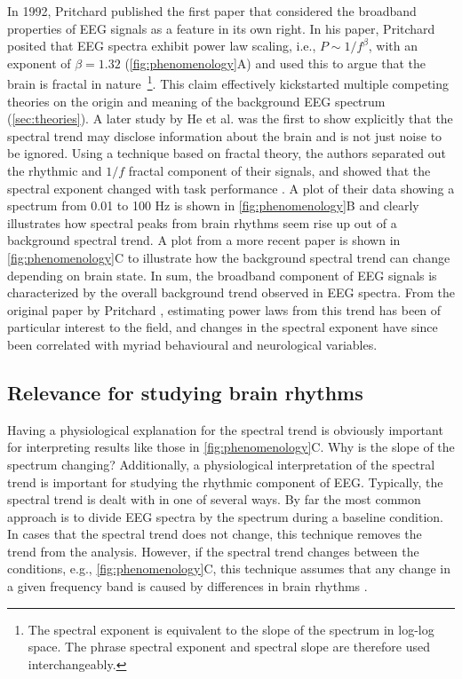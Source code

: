 In 1992, Pritchard \cite{Pritchard1992} published the first paper that considered the broadband properties of EEG signals as a feature in its own right. In his paper, Pritchard posited that EEG spectra exhibit power law scaling, i.e., $P\sim1/f^\beta$, with an exponent of $\beta=1.32$ (\autoref{fig:phenomenology}A) and used this to argue that the brain is fractal in nature~\footnote[2]{The spectral exponent is equivalent to the slope of the spectrum in log-log space. The phrase spectral exponent and spectral slope are therefore used interchangeably.}. This claim effectively kickstarted multiple competing theories on the origin and meaning of the background EEG spectrum (\autoref{sec:theories}). A later study by He et al. \cite{He2010} was the first to show explicitly that the spectral trend may disclose information about the brain and is not just noise to be ignored. Using a technique based on fractal theory, the authors separated out the rhythmic and $1/f$ fractal component of their signals, and showed that the spectral exponent changed with task performance \cite{He2010}. A plot of their data showing a spectrum from 0.01 to 100 \unit{\hertz} is shown in \autoref{fig:phenomenology}B and clearly illustrates how spectral peaks from brain rhythms seem rise up out of a background spectral trend. A plot from a more recent paper \cite{Colombo2019} is shown in \autoref{fig:phenomenology}C to illustrate how the background spectral trend can change depending on brain state. In sum, the broadband component of EEG signals is characterized by the overall background trend observed in EEG spectra. From the original paper by Pritchard \cite{Pritchard1992}, estimating power laws from this trend has been of particular interest to the field, and changes in the spectral exponent have since been correlated with myriad behavioural and neurological variables.

\subsection{Relevance for studying brain rhythms} \label{sec:detrending}
Having a physiological explanation for the spectral trend is obviously important for interpreting results like those in \autoref{fig:phenomenology}C. Why is the slope of the spectrum changing?
Additionally, a physiological interpretation of the spectral trend is important for studying the rhythmic component of EEG. Typically, the spectral trend is dealt with in one of several ways. By far the most common approach is to divide EEG spectra by the spectrum during a baseline condition. In cases that the spectral trend does not change, this technique removes the trend from the analysis. However, if the spectral trend changes between the conditions, e.g., \autoref{fig:phenomenology}C, this technique assumes that any change in a given frequency band is caused by differences in brain rhythms \cite{Gerster2022}.

